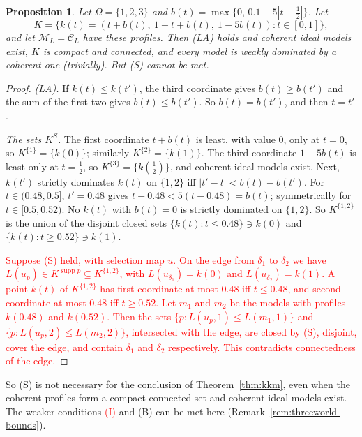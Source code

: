 \documentclass[11pt]{article}
\newtheorem{proposition}[theorem]{Proposition}
\theoremstyle{definition}
\theoremstyle{remark}
\newcommand{\M}{\mathcal M}
\newcommand{\C}{\mathcal C}
\newcommand{\supp}{\operatorname{supp}}
\begin{document}
\begin{proposition}\label{prop:threeworld}
Let $\Omega=\{1,2,3\}$ and $b(t)=\max\{0,\,0.1-5|t-\tfrac12|\}$. Let
\[
 K=\{k(t)=(t+b(t),\ 1-t+b(t),\ 1-5b(t)):t\in[0,1]\},
\]
and let $\M_L=\C_L$ have these profiles. Then (LA) holds and coherent ideal models exist, $K$ is compact and connected, and every model is weakly dominated by a coherent one (trivially). But (S) cannot be met.
\end{proposition}
\begin{proof}
\emph{(LA).} If $k(t)\le k(t')$, the third coordinate gives $b(t)\ge b(t')$ and the sum of the first two gives $b(t)\le b(t')$. So $b(t)=b(t')$, and then $t=t'$.

\emph{The sets $K^S$.} The first coordinate $t+b(t)$ is least, with value $0$, only at $t=0$, so $K^{\{1\}}=\{k(0)\}$; similarly $K^{\{2\}}=\{k(1)\}$. The third coordinate $1-5b(t)$ is least only at $t=\tfrac12$, so $K^{\{3\}}=\{k(\tfrac12)\}$, and coherent ideal models exist. Next, $k(t')$ strictly dominates $k(t)$ on $\{1,2\}$ iff $|t'-t|<b(t)-b(t')$. For $t\in(0.48,0.5]$, $t'=0.48$ gives $t-0.48<5(t-0.48)=b(t)$; symmetrically for $t\in[0.5,0.52)$. No $k(t)$ with $b(t)=0$ is strictly dominated on $\{1,2\}$. So $K^{\{1,2\}}$ is the union of the disjoint closed sets $\{k(t):t\le0.48\}\ni k(0)$ and $\{k(t):t\ge0.52\}\ni k(1)$.

\textcolor{red}{Suppose (S) held, with selection map $u$. On the edge from $\delta_1$ to $\delta_2$ we have $L(u_p)\in K^{\supp p}\subseteq K^{\{1,2\}}$, with $L(u_{\delta_1})=k(0)$ and $L(u_{\delta_2})=k(1)$. A point $k(t)$ of $K^{\{1,2\}}$ has first coordinate at most $0.48$ iff $t\le0.48$, and second coordinate at most $0.48$ iff $t\ge0.52$. Let $m_1$ and $m_2$ be the models with profiles $k(0.48)$ and $k(0.52)$. Then the sets $\{p:L(u_p,1)\le L(m_1,1)\}$ and $\{p:L(u_p,2)\le L(m_2,2)\}$, intersected with the edge, are closed by (S), disjoint, cover the edge, and contain $\delta_1$ and $\delta_2$ respectively. This contradicts connectedness of the edge.}
\end{proof}
So (S) is not necessary for the conclusion of Theorem~\ref{thm:kkm}, even when the coherent profiles form a compact connected set and coherent ideal models exist. The weaker conditions \textcolor{red}{(I)} and (B) can be met here (Remark~\ref{rem:threeworld-bounds}).
\end{document}
